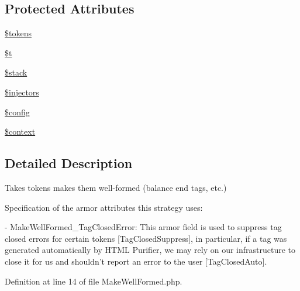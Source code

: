 \subsection*{Protected Attributes}
\begin{DoxyCompactItemize}
\item 
\hyperlink{classHTMLPurifier__Strategy__MakeWellFormed_afb844c69e9d6e032993b50048c6c08ff}{\$tokens}
\item 
\hyperlink{classHTMLPurifier__Strategy__MakeWellFormed_a1f363142a9154902642833c7c41c9536}{\$t}
\item 
\hyperlink{classHTMLPurifier__Strategy__MakeWellFormed_a42b5206c0b08d3713224da362e3893b1}{\$stack}
\item 
\hyperlink{classHTMLPurifier__Strategy__MakeWellFormed_a8f24bfd1c7814eabfcfe377b671fef55}{\$injectors}
\item 
\hyperlink{classHTMLPurifier__Strategy__MakeWellFormed_a652d2a2d24b6290651cef30a794385ca}{\$config}
\item 
\hyperlink{classHTMLPurifier__Strategy__MakeWellFormed_a2183f02d99e6db551da2a8aa2f53a26f}{\$context}
\end{DoxyCompactItemize}


\subsection{Detailed Description}
Takes tokens makes them well-\/formed (balance end tags, etc.)

Specification of the armor attributes this strategy uses\+: \begin{DoxyVerb} - MakeWellFormed_TagClosedError: This armor field is used to
   suppress tag closed errors for certain tokens [TagClosedSuppress],
   in particular, if a tag was generated automatically by HTML
   Purifier, we may rely on our infrastructure to close it for us
   and shouldn't report an error to the user [TagClosedAuto].\end{DoxyVerb}
 

Definition at line 14 of file Make\+Well\+Formed.\+php.



